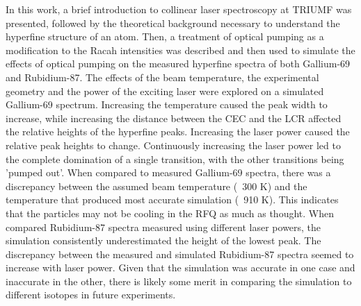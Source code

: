 In this work, a brief introduction to collinear laser spectroscopy at TRIUMF was presented, followed by the theoretical background necessary to understand the hyperfine structure of an atom. Then, a treatment of optical pumping as a modification to the Racah intensities was described and then used to simulate the effects of optical pumping on the measured hyperfine spectra of both Gallium-69 and Rubidium-87. The effects of the beam temperature, the experimental geometry and the power of the exciting laser were explored on a simulated Gallium-69 spectrum. Increasing the temperature caused the peak width to increase, while increasing the distance between the CEC and the LCR affected the relative heights of the hyperfine peaks. Increasing the laser power caused the relative peak heights to change. Continuously increasing the laser power led to the complete domination of a single transition, with the other transitions being 'pumped out'. When compared to measured Gallium-69 spectra, there was a discrepancy between the assumed beam temperature (~300 K) and the temperature that produced most accurate simulation (~910 K). This indicates that the particles may not be cooling in the RFQ as much as thought. When compared Rubidium-87 spectra measured using different laser powers, the simulation consistently underestimated the height of the lowest peak. The discrepancy between the measured and simulated Rubidium-87 spectra seemed to increase with laser power. Given that the simulation was accurate in one case and inaccurate in the other, there is likely some merit in comparing the simulation to different isotopes in future experiments. 
